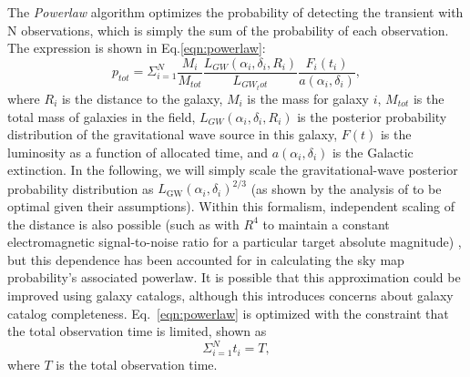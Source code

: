 \documentclass[twocolumn]{aastex62}
\begin{document}
The \emph{Powerlaw} algorithm optimizes the probability of detecting the transient with N observations, which is simply the sum of the probability of each observation. The expression is shown in Eq.\ref{eqn:powerlaw}:
\begin{equation}\label{eqn:powerlaw}
p_{tot}=\Sigma_{i=1}^N \frac{M_i}{M_{tot}}\frac{L_{GW}(\alpha_i, \delta_i, R_i)}{L_{GW_tot}}\frac{F_i(t_i)}{a(\alpha_i, \delta_i)},
\end{equation}
where $R_i$ is the distance to the galaxy, $M_i$ is the mass for galaxy $i$, $M_{tot}$ is the total mass of galaxies in the field, $L_{GW}(\alpha_i, \delta_i, R_i)$ is the posterior probability distribution of the gravitational wave source in this galaxy, $F(t)$ is the luminosity as a function of allocated time, and $a(\alpha_i, \delta_i)$ is the Galactic extinction. In the following, we will simply scale the gravitational-wave posterior probability distribution as $L_\textrm{GW}(\alpha_i,\delta_i)^{2/3}$ (as shown by the analysis of \cite{CoSt2016a} to be optimal given their assumptions). Within this formalism, independent scaling of the distance is also possible (such as with $R^4$ to maintain a constant electromagnetic signal-to-noise ratio for a particular target absolute magnitude) , but this dependence has been accounted for in calculating the sky map probability's associated powerlaw. It is possible that this approximation could be improved using galaxy catalogs, although this introduces concerns about galaxy catalog completeness. Eq.~\ref{eqn:powerlaw} is optimized with the constraint that the total observation time is limited, shown as
\begin{equation}
\Sigma_{i=1}^N t_i=T,
\end{equation}
where $T$ is the total observation time.
\end{document}
